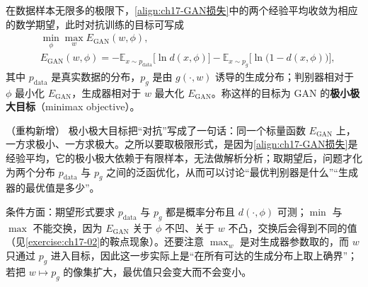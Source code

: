 \documentclass[../../main.tex]{subfiles}
\begin{document}
\begin{definition}\label{definition:ch17-极小极大目标}
在数据样本无限多的极限下，\eqref{align:ch17-GAN损失}中的两个经验平均收敛为相应的数学期望，此时对抗训练的目标可写成
\begin{align*}
&\min_{\phi}\max_{w}E_{\mathrm{GAN}}(w,\phi),\\
&E_{\mathrm{GAN}}(w,\phi)=-\mathbb{E}_{x\sim p_{\mathrm{data}}}\big[\ln d(x,\phi)\big]-\mathbb{E}_{x\sim p_g}\big[\ln\big(1-d(x,\phi)\big)\big],
\end{align*}
其中 $p_{\mathrm{data}}$ 是真实数据的分布，$p_g$ 是由 $g(\cdot,w)$ 诱导的生成分布；判别器相对于 $\phi$ 最小化 $E_{\mathrm{GAN}}$，生成器相对于 $w$ 最大化 $E_{\mathrm{GAN}}$。称这样的目标为 GAN 的\textbf{极小极大目标}（minimax objective）。
\end{definition}

\begin{remark}（重构新增）
极小极大目标把“对抗”写成了一句话：同一个标量函数 $E_{\mathrm{GAN}}$ 上，一方求极小、一方求极大。之所以要取极限形式，是因为\eqref{align:ch17-GAN损失}是经验平均，它的极小极大依赖于有限样本，无法做解析分析；取期望后，问题才化为两个分布 $p_{\mathrm{data}}$ 与 $p_g$ 之间的泛函优化，从而可以讨论“最优判别器是什么”“生成器的最优值是多少”。

条件方面：期望形式要求 $p_{\mathrm{data}}$ 与 $p_g$ 都是概率分布且 $d(\cdot,\phi)$ 可测；$\min$ 与 $\max$ 不能交换，因为 $E_{\mathrm{GAN}}$ 关于 $\phi$ 不凹、关于 $w$ 不凸，交换后会得到不同的值（见\cref{exercise:ch17-02}的鞍点现象）。还要注意 $\max_w$ 是对生成器参数取的，而 $w$ 只通过 $p_g$ 进入目标，因此这一步实际上是“在所有可达的生成分布上取上确界”；若把 $w\mapsto p_g$ 的像集扩大，最优值只会变大而不会变小。
\end{remark}
\end{document}
